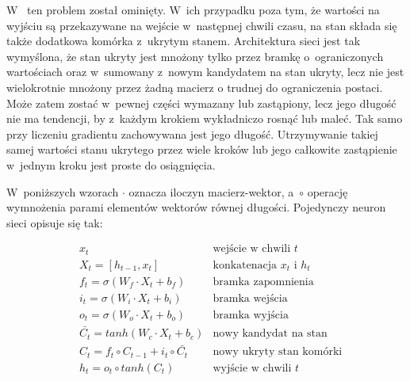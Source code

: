 W~ ten problem został ominięty. W~ich przypadku poza tym, że wartości na wyjściu są przekazywane
na wejście w~następnej chwili czasu, na stan składa się także dodatkowa komórka z~ukrytym stanem.
Architektura sieci jest tak wymyślona, że stan ukryty jest mnożony tylko przez bramkę o~ograniczonych wartościach
oraz w~sumowany z~nowym kandydatem na stan ukryty, lecz nie jest wielokrotnie mnożony przez żadną macierz o
trudnej do ograniczenia postaci. Może zatem zostać w~pewnej części wymazany lub zastąpiony, lecz jego długość
nie ma tendencji, by z~każdym krokiem wykładniczo rosnąć lub maleć. Tak samo przy liczeniu gradientu
zachowywana jest jego długość. Utrzymywanie takiej samej wartości stanu ukrytego przez wiele kroków lub
jego całkowite zastąpienie w~jednym kroku jest proste do osiągnięcia.

W~poniższych wzorach $\cdot$ oznacza iloczyn macierz-wektor, a~$\circ$ operację wymnożenia parami
elementów wektorów równej długości. Pojedynczy neuron sieci  opisuje się tak:

\begin{align*}
& x_t & \text{wejście w~chwili } t\\
& X_t = [h_{t-1}, x_t] & \text{konkatenacja } x_t \text{ i~} h_t\\
& f_t = \sigma(W_f \cdot X_t + b_f) & \text{bramka zapomnienia}\\
& i_t = \sigma(W_i \cdot X_t + b_i) & \text{bramka wejścia}\\
& o_t = \sigma(W_o \cdot X_t + b_o) & \text{bramka wyjścia}\\
& \bar{C_t} = tanh(W_c \cdot X_t + b_c) & \text{nowy kandydat na stan}\\
& C_t = f_t \circ C_{t-1} + i_t \circ \bar{C_t} & \text{nowy ukryty stan komórki}\\
& h_t = o_t \circ tanh(C_t) & \text{wyjście w~chwili } t
\end{align*}

